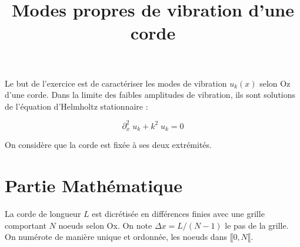 \documentclass[a4paper, 12pt]{article}
\begin{document}


\title{Modes propres de vibration d'une corde}

\date{\vspace{-10ex}}
 
\maketitle

 
Le but de l'exercice est de caractériser les modes de vibration $u_k(x)$ selon Oz d'une corde.
Dans la limite des faibles amplitudes de vibration,  ils sont solutions de l'équation d'Helmholtz stationnaire :

\begin{equation}
\partial_x^2 \; u_k + k^2 \; u_k=0
\label{Helm}
\end{equation}

On considère que la corde est fixée à ses deux extrémités.


\section{Partie Mathématique}

La corde de longueur $L$ est dicrétisée en différences finies
avec une grille comportant $N$ noeuds selon Ox. On note $\Delta x = L / (N-1)$ le pas de la grille.
 On numérote de manière unique et ordonnée, les noeuds dans $\llbracket 0, N \llbracket$. 
 
\end{document}
